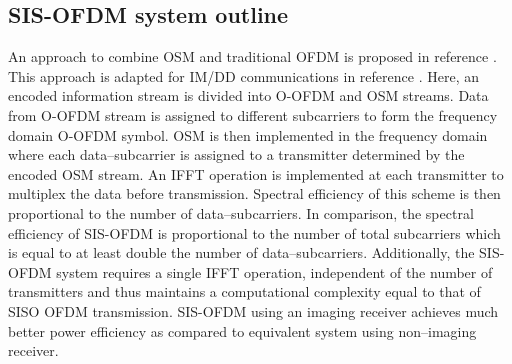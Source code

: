 \subsection{SIS-OFDM system outline}
\label{subsec:sisofdmSystem}

An approach to combine OSM and traditional OFDM is proposed in reference \cite{gan06a}. This approach is adapted for IM/DD communications in reference \cite{zha12a}. 
Here, an encoded information stream is divided into O-OFDM and OSM streams. Data from O-OFDM stream is assigned to different subcarriers to form the frequency domain O-OFDM symbol. OSM is then implemented in the frequency domain where each data--subcarrier is assigned to a transmitter determined by the encoded OSM stream. An IFFT operation is implemented at each transmitter to multiplex the data before transmission. Spectral efficiency of this scheme is then proportional to the number of data--subcarriers. In comparison, the spectral efficiency of SIS-OFDM is proportional to the number of total subcarriers which is equal to at least double the number of data--subcarriers. Additionally, the SIS-OFDM system requires a single IFFT operation, independent of the number of transmitters and thus maintains a computational complexity equal to that of SISO OFDM transmission. SIS-OFDM using an imaging receiver achieves much better power efficiency as compared to equivalent system using non--imaging receiver.

